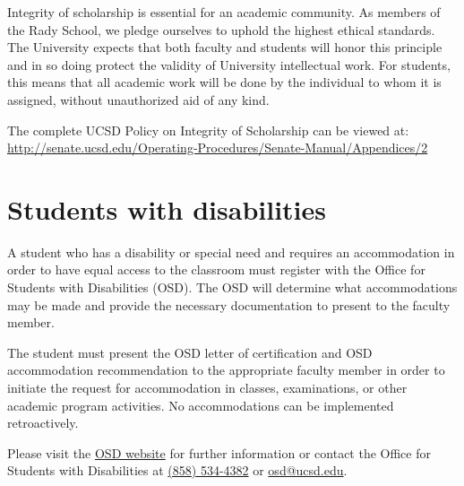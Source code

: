 \documentclass{article}
\begin{document}
Integrity of scholarship is essential for an academic community. As members of the Rady School, we pledge ourselves to uphold the highest ethical standards. The University expects that both faculty and students will honor this principle and in so doing protect the validity of University intellectual work. For students, this means that all academic work will be done by the individual to whom it is assigned, without unauthorized aid of any kind.

The complete UCSD Policy on Integrity of Scholarship can be viewed at:
\url{http://senate.ucsd.edu/Operating-Procedures/Senate-Manual/Appendices/2}

\section*{Students with disabilities}

A student who has a disability or special need and requires an accommodation in order to have equal access to the classroom must register with the Office for Students with Disabilities (OSD). The OSD will determine what accommodations may be made and provide the necessary documentation to present to the faculty member.

The student must present the OSD letter of certification and OSD accommodation recommendation to the appropriate faculty member in order to initiate the request for accommodation in classes, examinations, or other academic program activities. No accommodations can be implemented retroactively.

Please visit the \href{http://disabilities.ucsd.edu/about/index.html}{OSD website} for further information or contact the Office for Students with Disabilities at \href{tel:(858) 534-4382}{(858) 534-4382} or \href{mailto:osd@ucsd.edu}{osd@ucsd.edu}.
\end{document}
